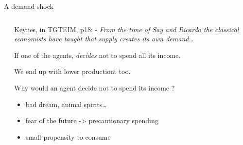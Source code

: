 \begin{frame}{A demand shock}
\begin{columns}[T]
\begin{column}{0.48\textwidth}
\begin{overprint}
\end{overprint}
\end{column}

\begin{column}{0.48\textwidth}

Keynes, in TGTEIM, p18: - \emph{From the time of Say and Ricardo the
classical economists have taught that supply creates its own
demand\ldots{}}


If one of the agents, \emph{decides} not to spend all its income.


We end up with lower productiont too.


Why would an agent decide not to spend its income ?

\begin{itemize}
\tightlist
\item
  bad dream, animal spirits\ldots{}
\item
  fear of the future -\textgreater{} precautionary spending
\item
  small propensity to consume
\end{itemize}
\end{column}
\end{columns}
\end{frame}

